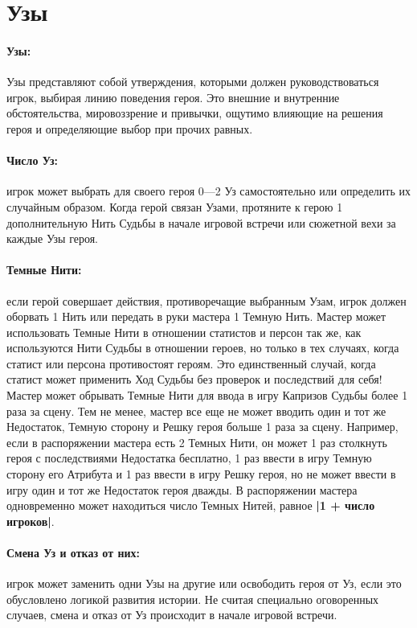 \section{Узы}
\paragraph{Узы:} Узы представляют собой утверждения, которыми должен руководствоваться игрок, выбирая линию поведения героя. Это внешние и внутренние обстоятельства, мировоззрение и привычки, ощутимо влияющие на решения героя и определяющие выбор при прочих равных.
\paragraph{Число Уз:} игрок может выбрать для своего героя 0—2 Уз самостоятельно или определить их случайным образом. Когда герой связан Узами, протяните к герою 1 дополнительную Нить Судьбы в начале игровой встречи или сюжетной вехи за каждые Узы героя.
\paragraph{Темные Нити:} если герой совершает действия, противоречащие выбранным Узам, игрок должен оборвать 1 Нить или передать в руки мастера 1 Темную Нить.
\newline
Мастер может использовать Темные Нити в отношении статистов и персон так же, как используются Нити Судьбы в отношении героев, но только в тех случаях, когда статист или персона противостоят героям. Это единственный случай, когда статист может применить Ход Судьбы без проверок и последствий для себя!
\newline
Мастер может обрывать Темные Нити для ввода в игру Капризов Судьбы более 1 раза за сцену. Тем не менее, мастер все еще не может вводить один и тот же Недостаток, Темную сторону и Решку героя больше 1 раза за сцену. Например, если в распоряжении мастера есть 2 Темных Нити, он может 1 раз столкнуть героя с последствиями Недостатка бесплатно, 1 раз ввести в игру Темную сторону его Атрибута и 1 раз ввести в игру Решку героя, но не может ввести в игру один и тот же Недостаток героя дважды. В распоряжении мастера одновременно может находиться число Темных Нитей, равное \textbf{|1 + число игроков|}.
\paragraph{Смена Уз и отказ от них:} игрок может заменить одни Узы на другие или освободить героя от Уз, если это обусловлено логикой развития истории. Не считая специально оговоренных случаев, смена и отказ от Уз происходит в начале игровой встречи.
